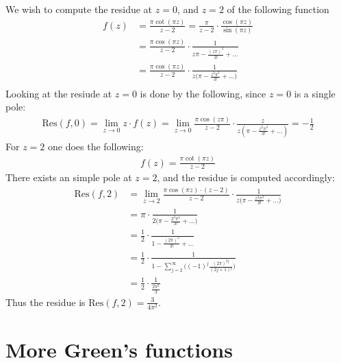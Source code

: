 \documentclass{article}
\newcommand{\res}[2]{\text{Res}(#1, #2)}
\begin{document}
We wish to compute the residue at $z = 0$, and $z=2$ of the following function
\begin{align*}
    f(z) &= \frac{\pi\cot(\pi z)}{z-2} = \frac{\pi}{z-2}\cdot\frac{\cos(\pi z)}{\sin(\pi z)}\\
    &=\frac{\pi\cos(\pi z)}{z-2}\cdot\frac{1}{z\pi - \frac{(z\pi)^3}{3!} + ...}\\
    &=\frac{\pi\cos(\pi z)}{z-2}\cdot\frac{1}{z\Big(\pi - \frac{z^2\pi^3}{3!} + ...\Big)}\\
\end{align*}Looking at the resiude at $z=0$ is done by the following, since $z=0$ is a single pole:
\begin{align*}
    \res{f}{0}=\lim_{z\to0}z\cdot f(z) = \lim_{z\to0}\frac{\pi\cos(z\pi)}{z-2}\cdot\frac{z}{z(\pi - \frac{z^2\pi^3}{3!} + ...)} = -\frac{1}{2}
\end{align*} For $z=2$ one does the following:
\begin{align*}
    f(z) = \frac{\pi\cot(\pi z)}{z-2}
\end{align*}There exists an simple pole at $z = 2$, and the residue is computed accordingly:
\begin{align*}
    \res{f}{2}&=\lim_{z\to2}\frac{\pi\cos(\pi z)\cdot(z-2)}{z-2}\cdot\frac{1}{z\Big(\pi - \frac{z^2\pi^3}{3!} + ...\Big)}\\
    &=\pi\cdot\frac{1}{2\Big(\pi - \frac{2^2\pi^3}{3!} + ...\Big)}\\
    &=\frac{1}{2}\cdot\frac{1}{1-\frac{(2\pi)^2}{3!} + ...}\\
    &=\frac{1}{2}\cdot\frac{1}{1 - \sum_{j = 2}^\infty \big((-1)^{j} \frac{(2\pi)^{2j}}{(2j + 1)!}\big)}\\
    &=\frac{1}{2}\cdot\frac{1}{\frac{2\pi^2}{3}}
\end{align*}Thus the residue is $\res{f}{2}=\frac{3}{4\pi^2}$.
\section{More Green's functions}
\end{document}
